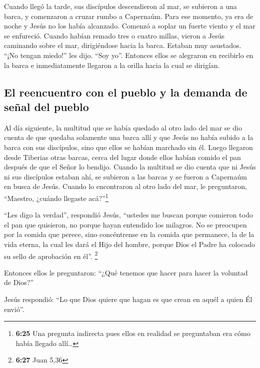  Cuando llegó la tarde, sus discípulos descendieron al
mar,  se subieron a una barca, y comenzaron a cruzar
rumbo a Capernaúm. Para ese momento, ya era de noche y Jesús no los
había alcanzado.  Comenzó a soplar un fuerte viento y el
mar se enfureció.  Cuando habían remado tres o cuatro
millas, vieron a Jesús caminando sobre el mar, dirigiéndose hacia la
barca. Estaban muy asustados.  ``¡No tengan miedo!'' les
dijo. ``Soy yo''.  Entonces ellos se alegraron en
recibirlo en la barca e inmediatamente llegaron a la orilla hacia la
cual se dirigían.

\hypertarget{el-reencuentro-con-el-pueblo-y-la-demanda-de-seuxf1al-del-pueblo}{%
\subsection{El reencuentro con el pueblo y la demanda de señal del
pueblo}\label{el-reencuentro-con-el-pueblo-y-la-demanda-de-seuxf1al-del-pueblo}}

 Al día siguiente, la multitud que se había quedado al
otro lado del mar se dio cuenta de que quedaba solamente una barca allí
y que Jesús no había subido a la barca con sus discípulos, sino que
ellos se habían marchado sin él.  Luego llegaron desde
Tiberias otras barcas, cerca del lugar donde ellos habían comido el pan
después de que el Señor lo bendijo.  Cuando la multitud
se dio cuenta que ni Jesús ni sus discípulos estaban ahí, se subieron a
las barcas y se fueron a Capernaúm en busca de Jesús. 
Cuando lo encontraron al otro lado del mar, le preguntaron, ``Maestro,
¿cuándo llegaste acá?''\footnote{\textbf{6:25} Una pregunta indirecta
  pues ellos en realidad se preguntaban era cómo había llegado
  allí\ldots{}}

 ``Les digo la verdad'', respondió Jesús, ``ustedes me
buscan porque comieron todo el pan que quisieron, no porque hayan
entendido los milagros.  No se preocupen por la comida
que perece, sino concéntrense en la comida que permanece, la de la vida
eterna, la cual les dará el Hijo del hombre, porque Dios el Padre ha
colocado su sello de aprobación en él''. \footnote{\textbf{6:27} Juan
  5,36}

 Entonces ellos le preguntaron: ``¿Qué tenemos que hacer
para hacer la voluntad de Dios?''

 Jesús respondió: ``Lo que Dios quiere que hagan es que
crean en aquél a quien Él envió''.

